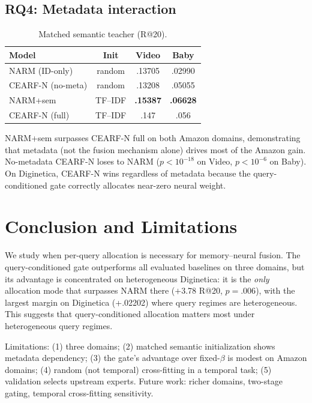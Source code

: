 \documentclass[runningheads]{llncs}
\newcommand{\method}{CEARF-N}
\begin{document}
\subsection{RQ4: Metadata interaction}

\begin{table}[H]
\caption{Matched semantic teacher (R@20).}
\label{tab:metadata}
\centering\scriptsize
\begin{tabular}{lccc}
\toprule
Model & Init & Video & Baby\\
\midrule
NARM (ID-only) & random & .13705 & .02990\\
\method{} (no-meta) & random & .13208 & .05055\\
NARM+sem & TF--IDF & \textbf{.15387} & \textbf{.06628}\\
\method{} (full) & TF--IDF & .147 & .056\\
\bottomrule
\end{tabular}
\end{table}

NARM+sem surpasses \method{} full on both Amazon domains, demonstrating that
metadata (not the fusion mechanism alone) drives most of the Amazon gain.
No-metadata \method{} loses to NARM ($p\!<\!10^{-18}$ on Video, $p\!<\!10^{-6}$
on Baby). On Diginetica, \method{} wins regardless of metadata because the
query-conditioned gate correctly allocates near-zero neural weight.

\section{Conclusion and Limitations}
We study when per-query allocation is necessary for memory--neural fusion.
The query-conditioned gate outperforms all evaluated baselines on three
domains, but its advantage is concentrated on heterogeneous Diginetica:
it is the \emph{only} allocation mode that surpasses NARM there ($+$3.78
R@20, $p\!=\!.006$), with the largest margin on Diginetica (+.02202) where query regimes
are heterogeneous.
This suggests that query-conditioned allocation matters most under
heterogeneous query regimes.

Limitations: (1) three domains; (2) matched semantic initialization shows
metadata dependency; (3) the gate's advantage over fixed-$\beta$ is modest
on Amazon domains; (4) random (not temporal) cross-fitting in a temporal task;
(5) validation selects upstream experts. Future work: richer domains,
two-stage gating, temporal cross-fitting sensitivity.



\end{document}
